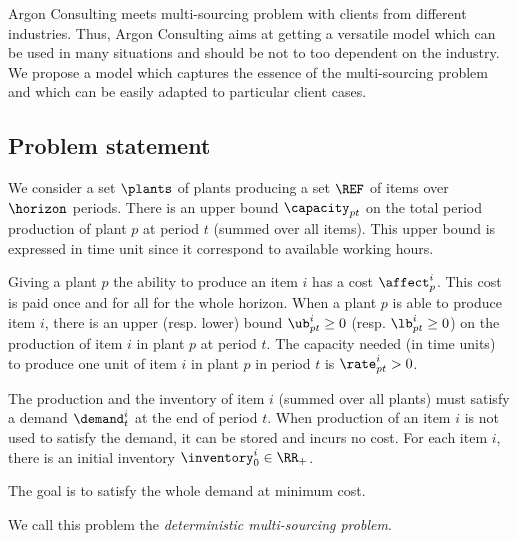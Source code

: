 Argon Consulting meets multi-sourcing problem with clients from different industries.
Thus, Argon Consulting aims at getting a versatile model which can be used in many situations and should be not to too dependent on the industry.
We propose a model which captures the essence of the multi-sourcing problem and which can be easily adapted to particular client cases.


\subsection{Problem statement}
\label{sec:multi-sourcing:deterministic:introduction:problem_statement}


We consider a set $\plants$ of plants producing a set $\REF$ of items over $\horizon$ periods.
There is an upper bound $\capacity_{pt}$ on the total period production of plant $p$ at period $t$ (summed over all items).
This upper bound is expressed in time unit since it correspond to available working hours.


Giving a plant $p$ the ability to produce an item $i$ has a cost $\affect_p^i$.
This cost is paid once and for all for the whole horizon.
When a plant $p$ is able to produce item $i$, there is an upper (resp. lower) bound $\ub_{pt}^i\ge 0$ (resp. $\lb_{pt}^i\ge 0$) on the production of item $i$ in plant $p$ at period $t$.
The capacity needed (in time units) to produce one unit of item $i$ in plant $p$ in period $t$ is $\rate_{pt}^i>0$.


The production and the inventory of item $i$ (summed over all plants) must satisfy a demand $\demand_t^i$ at the end of period $t$.
When production of an item $i$ is not used to satisfy the demand, it can be stored and incurs no cost.
For each item $i$, there is an initial inventory $\inventory_0^i\in\RR_+$.


The goal is to satisfy the whole demand at minimum cost.


We call this problem the \emph{deterministic multi-sourcing problem}.


\medskip


